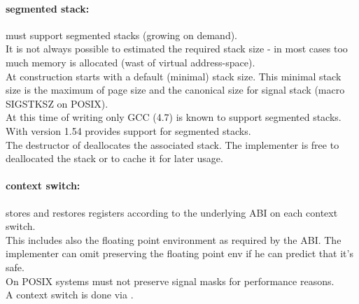 \paragraph*{segmented stack:}
\coro must support segmented stacks (growing on demand).\\
\newline
It is not always possible to estimated the required stack size - in most cases
too much memory is allocated (wast of virtual address-space).\\
\newline
At construction \coro starts with a default (minimal) stack size. This minimal
stack size is the maximum of page size and the canonical size for signal stack
(macro SIGSTKSZ on POSIX).\\
\newline
At this time of writing only GCC (4.7)\cite{gccsplit} is known to support segmented
stacks. With version 1.54 \boostcoroutine provides support for segmented stacks.\\
\newline
The destructor of \coro deallocates the associated stack. The implementer is
free to deallocated the stack or to cache it for later usage.

\paragraph*{context switch:}
\coro stores and restores registers according to the underlying ABI on each
context switch.\\
\newline
This includes also the floating point environment as required by the ABI. The
implementer can omit preserving the floating point env if he can predict that
it's safe.\\
\newline
On POSIX systems \coro must not preserve signal masks for performance reasons.\\
\newline
A context switch is done via \coroop.

